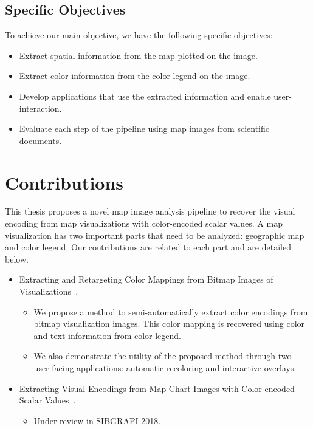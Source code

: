 \subsection*{Specific Objectives}
To achieve our main objective, we have the following specific objectives:
\begin{itemize}
 \item Extract spatial information from the map plotted on the image.
 \item Extract color information from the color legend on the image.
 \item Develop applications that use the extracted information and enable user-interaction.
 \item Evaluate each step of the pipeline using map images from scientific documents.
\end{itemize}


\section{Contributions}
This thesis proposes a novel map image analysis pipeline to recover the visual encoding from map visualizations with color-encoded scalar values. A map visualization has two important parts that need to be analyzed: geographic map and color legend. Our contributions are related to each part and are detailed below.

\begin{itemize}
 \item Extracting and Retargeting Color Mappings from Bitmap Images of Visualizations~\citep{Poco2017a}.
 \begin{itemize}
  \item We propose a method to semi-automatically extract color encodings from bitmap visualization images. This color mapping is recovered using color and text information from color legend.
  \item We also demonstrate the utility of the proposed method through two user-facing applications: automatic recoloring and interactive overlays.
 \end{itemize}
 \item Extracting Visual Encodings from Map Chart Images with Color-encoded Scalar Values~\citep{Mayhua2018}.
 \begin{itemize}
  \item Under review in SIBGRAPI 2018.
 \end{itemize}
\end{itemize}



